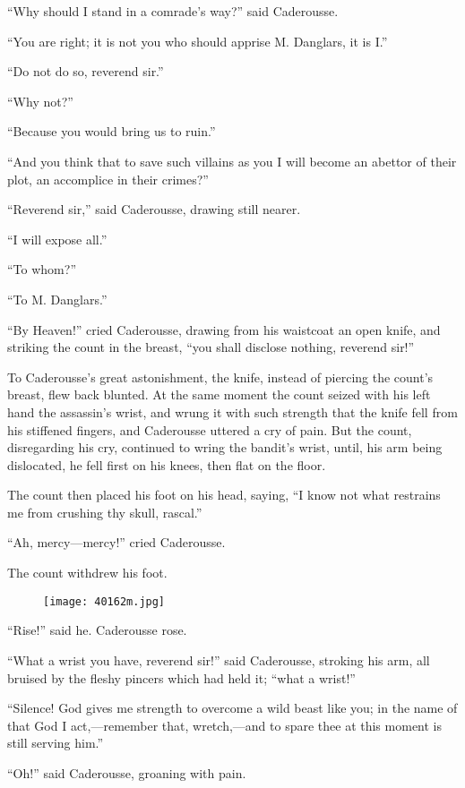 “Why should I stand in a comrade’s way?” said Caderousse.

“You are right; it is not you who should apprise M. Danglars, it is I.”

“Do not do so, reverend sir.”

“Why not?”

“Because you would bring us to ruin.”

“And you think that to save such villains as you I will become an
abettor of their plot, an accomplice in their crimes?”

“Reverend sir,” said Caderousse, drawing still nearer.

“I will expose all.”

“To whom?”

“To M. Danglars.”

“By Heaven!” cried Caderousse, drawing from his waistcoat an open
knife, and striking the count in the breast, “you shall disclose
nothing, reverend sir!”

To Caderousse’s great astonishment, the knife, instead of piercing the
count’s breast, flew back blunted. At the same moment the count seized
with his left hand the assassin’s wrist, and wrung it with such
strength that the knife fell from his stiffened fingers, and Caderousse
uttered a cry of pain. But the count, disregarding his cry, continued
to wring the bandit’s wrist, until, his arm being dislocated, he fell
first on his knees, then flat on the floor.

The count then placed his foot on his head, saying, “I know not what
restrains me from crushing thy skull, rascal.”

“Ah, mercy—mercy!” cried Caderousse.

The count withdrew his foot.

\begin{figure}[ht]
\texttt{[image: 40162m.jpg]}
\end{figure}

“Rise!” said he. Caderousse rose.

“What a wrist you have, reverend sir!” said Caderousse, stroking his
arm, all bruised by the fleshy pincers which had held it; “what a
wrist!”

“Silence! God gives me strength to overcome a wild beast like you; in
the name of that God I act,—remember that, wretch,—and to spare thee at
this moment is still serving him.”

“Oh!” said Caderousse, groaning with pain.

